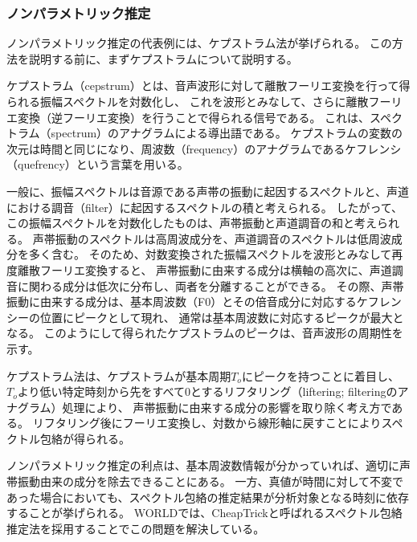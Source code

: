 \subsubsection{ノンパラメトリック推定}

ノンパラメトリック推定の代表例には、ケプストラム法が挙げられる。
この方法を説明する前に、まずケプストラムについて説明する。

ケプストラム（cepstrum）とは、音声波形に対して離散フーリエ変換を行って得られる振幅スペクトルを対数化し、
これを波形とみなして、さらに離散フーリエ変換（逆フーリエ変換）を行うことで得られる信号である。
これは、スペクトラム（spectrum）のアナグラムによる導出語である。
ケプストラムの変数の次元は時間と同じになり、周波数（frequency）のアナグラムであるケフレンシ（quefrency）という言葉を用いる。

一般に、振幅スペクトルは音源である声帯の振動に起因するスペクトルと、声道における調音（filter）に起因するスペクトルの積と考えられる。
したがって、この振幅スペクトルを対数化したものは、声帯振動と声道調音の和と考えられる。
声帯振動のスペクトルは高周波成分を、声道調音のスペクトルは低周波成分を多く含む。
そのため、対数変換された振幅スペクトルを波形とみなして再度離散フーリエ変換すると、
声帯振動に由来する成分は横軸の高次に、声道調音に関わる成分は低次に分布し、両者を分離することができる。
その際、声帯振動に由来する成分は、基本周波数（F0）とその倍音成分に対応するケフレンシーの位置にピークとして現れ、
通常は基本周波数に対応するピークが最大となる。
このようにして得られたケプストラムのピークは、音声波形の周期性を示す。

ケプストラム法は、ケプストラムが基本周期$T_o$にピークを持つことに着目し、
$T_o$より低い特定時刻から先をすべて0とするリフタリング（liftering; filteringのアナグラム）処理により、
声帯振動に由来する成分の影響を取り除く考え方である。
リフタリング後にフーリエ変換し、対数から線形軸に戻すことによりスペクトル包絡が得られる。

ノンパラメトリック推定の利点は、基本周波数情報が分かっていれば、適切に声帯振動由来の成分を除去できることにある。
一方、真値が時間に対して不変であった場合においても、スペクトル包絡の推定結果が分析対象となる時刻に依存することが挙げられる。
WORLDでは、CheapTrick\cite{morise2015Cheap}と呼ばれるスペクトル包絡推定法を採用することでこの問題を解決している。



